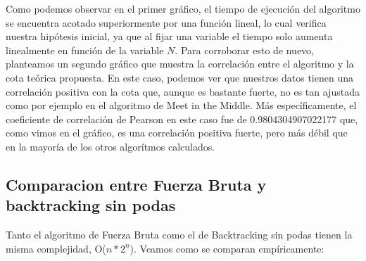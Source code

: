 Como podemos observar en el primer gráfico, el tiempo de ejecución del algoritmo se encuentra acotado superiormente por una función lineal, lo cual verifica nuestra hipótesis inicial, ya que al fijar una variable el tiempo solo aumenta linealmente en función de la variable $N$. Para corroborar esto de nuevo, planteamos un segundo gráfico que muestra la correlación entre el algoritmo y la cota teórica propuesta. En este caso, podemos ver que nuestros datos tienen una correlación positiva con la cota que, aunque es bastante fuerte, no es tan ajustada como por ejemplo en el algoritmo de Meet in the Middle. Más específicamente, el coeficiente de correlación de Pearson en este caso fue de 0.9804304907022177 que, como vimos en el gráfico, es una correlación positiva fuerte, pero más débil que en la mayoría de los otros algorítmos calculados.

\subsection*{Comparacion entre Fuerza Bruta y backtracking sin podas}
Tanto el algoritmo de Fuerza Bruta como el de Backtracking sin podas tienen la misma complejidad, O($n*2^{n}$). Veamos como se comparan empíricamente:

